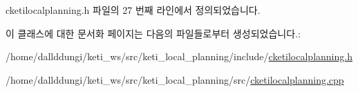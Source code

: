 cketilocalplanning.\+h 파일의 27 번째 라인에서 정의되었습니다.



이 클래스에 대한 문서화 페이지는 다음의 파일들로부터 생성되었습니다.\+:\begin{DoxyCompactItemize}
\item 
/home/dallddungi/keti\+\_\+ws/src/keti\+\_\+local\+\_\+planning/include/\hyperlink{cketilocalplanning_8h}{cketilocalplanning.\+h}\item 
/home/dallddungi/keti\+\_\+ws/src/keti\+\_\+local\+\_\+planning/src/\hyperlink{cketilocalplanning_8cpp}{cketilocalplanning.\+cpp}\end{DoxyCompactItemize}
